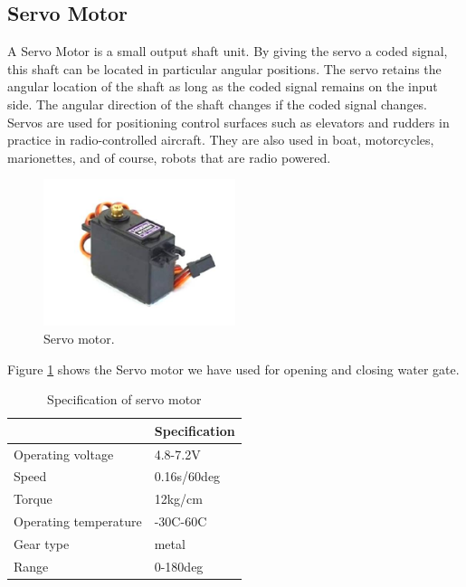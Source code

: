 \subsection{Servo Motor}
A Servo Motor is a small output shaft unit. By giving the servo a coded signal, this shaft can be located in particular angular positions. The servo retains the angular location of the shaft as long as the coded signal remains on the input side. The angular direction of the shaft changes if the coded signal changes. Servos are used for positioning control surfaces such as elevators and rudders in practice in radio-controlled aircraft. They are also used in boat, motorcycles, marionettes, and of course, robots that are radio powered.
\begin{figure}[h]
\centering
\includegraphics[width=0.5\textwidth]{figures/MG996R-Servo-Motor.jpg}
\caption{Servo motor.}
\label{Servo1}
\end{figure}
Figure \ref{Servo1} shows the Servo motor we have used for opening and closing water gate.

\begin{table}[H]
\centering
\caption{Specification of servo motor}
\begin{tabular}{|l|l|}
\hline
\multicolumn{1}{|c|}{\cellcolor[HTML]{FFFFFF}{\color[HTML]{333333} \textbf{Characteristics}}} & \textbf{Specification} \\ \hline
Operating voltage                                                                       & 4.8-7.2V               \\ \hline
Speed                                                                                   & 0.16s/60deg            \\ \hline
Torque                                                                                  & 12kg/cm                \\ \hline
Operating temperature                                                                   & -30C-60C               \\ \hline
Gear type                                                                               & metal                  \\ \hline
Range                                                                                   & 0-180deg               \\ \hline
\end{tabular}
\end{table}

